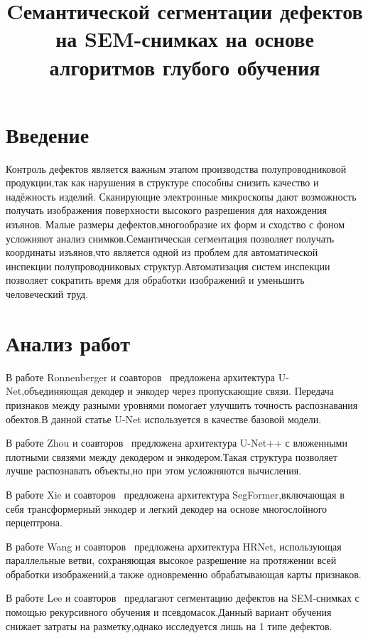 \documentclass{misisarticle}
\title{Cемантической сегментации дефектов на SEM-снимках на основе алгоритмов глубого обучения}
\begin{document}
	
	\maketitle
	
	\section{Введение}
	
	Контроль дефектов является важным этапом производства полупроводниковой продукции,так как нарушения в структуре способны снизить качество и надёжность изделий. Сканирующие электронные микроскопы дают возможность получать изображения поверхности высокого разрешения для нахождения изъянов. Малые размеры дефектов,многообразие их форм и сходство с фоном усложняют анализ снимков.Семантическая сегментация позволяет получать координаты изъянов,что является одной из проблем для автоматической инспекции полупроводниковых структур.Автоматизация систем инспекции позволяет сократить время для обработки изображений и уменьшить человеческий труд.
	
	\section{Анализ работ}
	
	В работе Ronnenberger и соавторов~\cite{ronneberger2015} предложена архитектура U-Net,объединяющая декодер и энкодер через пропускающие связи. Передача признаков между разными уровнями помогает улучшить точность распознавания обектов.В данной статье U-Net используется в качестве базовой модели.
	
	В работе Zhou и соавторов~\cite{zhou2018} предложена архитектура U-Net++ с вложенными плотными связями между декодером и энкодером.Такая структура позволяет лучше распознавать объекты,но при этом усложняются вычисления.
	
	В работе Xie и соавторов~\cite{xie2021} предложена архитектура SegFormer,включающая в себя трансформерный энкодер и легкий декодер на основе многослойного перцептрона.
	
	В работе Wang и соавторов~\cite{wang2020} предложена архитектура HRNet, использующая параллельные ветви, сохраняющая высокое разрешение на протяжении всей обработки изображений,а также одновременно обрабатывающая карты признаков. 
	
	В работе Lee и соавторов~\cite{lee2024} предлагают сегментацию дефектов на SEM-снимках с помощью рекурсивного обучения и псевдомасок.Данный вариант обучения снижает затраты на разметку,однако исследуется лишь на 1 типе дефектов.
	
\end{document}
